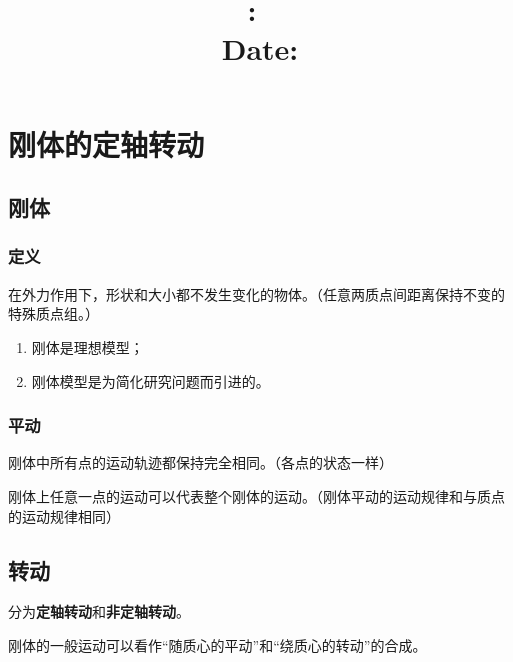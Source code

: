 \documentclass[12pt, a4paper]{article}
\title{
    \vspace{2in}
    \textmd{\textbf{\hmwkClass:\ \hmwkTitle}}\\
    \normalsize\vspace{0.1in}\small{Date: \hmwkDueDate}\\
    \vspace{0.1in}\large{\textit{\myUniversiy}}
    \vspace{3in}
}
\author{\hmwkAuthorName}
\date{}
\numberwithin{equation}{section}
\begin{document}
\maketitle

\pagebreak


\tableofcontents

\pagebreak


\pagebreak

\section{刚体的定轴转动}

\subsection{刚体}

\subsubsection{定义}

    在外力作用下，形状和大小都不发生变化的物体。（任意两质点间距离保持不变的特殊质点组。）

    \begin{enumerate}
        \item 刚体是理想模型；
        \item 刚体模型是为简化研究问题而引进的。
    \end{enumerate}

\subsubsection{平动}

    刚体中所有点的运动轨迹都保持完全相同。（各点的状态一样）

    刚体上任意一点的运动可以代表整个刚体的运动。（刚体平动的运动规律和与质点的运动规律相同）

\subsection{转动}

    分为\textbf{定轴转动}和\textbf{非定轴转动}。

    刚体的一般运动可以看作“随质心的平动”和“绕质心的转动”的合成。
\end{document}
